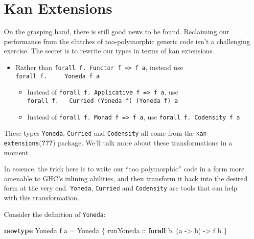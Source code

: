 \documentclass[
  11pt,
]{book}
\newenvironment{Shaded}{}{}
\newcommand{\DataTypeTok}[1]{\textcolor[rgb]{0.56,0.13,0.00}{#1}}
\newcommand{\KeywordTok}[1]{\textcolor[rgb]{0.00,0.44,0.13}{\textbf{#1}}}
\newcommand{\NormalTok}[1]{#1}
\newcommand{\OperatorTok}[1]{\textcolor[rgb]{0.40,0.40,0.40}{#1}}
\newcommand{\OtherTok}[1]{\textcolor[rgb]{0.00,0.44,0.13}{#1}}
\providecommand{\tightlist}{%
  \setlength{\itemsep}{0pt}\setlength{\parskip}{0pt}}
\theoremstyle{nonumberplain}
\begin{document}
\hypertarget{kan-extensions}{%
\section{Kan Extensions}\label{kan-extensions}}

On the grasping hand, there is still good news to be found. Reclaiming
our performance from the clutches of too-polymorphic generic code isn't
a challenging exercise. The secret is to rewrite our types in terms of
kan extensions.

\begin{itemize}
\tightlist
\item
  Rather than \texttt{forall\ f.\ Functor\ f\ =\textgreater{}\ f\ a},
  instead use \texttt{forall\ f.\ \ \ \ \ Yoneda\ f\ a}

  \begin{itemize}
  \tightlist
  \item
    Instead of
    \texttt{forall\ f.\ Applicative\ f\ =\textgreater{}\ f\ a}, use
    \texttt{forall\ f.\ \ \ Curried\ (Yoneda\ f)\ (Yoneda\ f)\ a}
  \item
    Instead of \texttt{forall\ f.\ Monad\ f\ =\textgreater{}\ f\ a}, use
    \texttt{forall\ f.\ Codensity\ f\ a}
  \end{itemize}
\end{itemize}

These types \texttt{Yoneda}, \texttt{Curried} and \texttt{Codensity} all
come from the \texttt{kan-extensions}({\textbf{???}}) package. We'll
talk more about these transformations in a moment.

In essence, the trick here is to write our ``too polymorphic'' code in a
form more amenable to GHC's inlining abilities, and then transform it
back into the desired form at the very end. \texttt{Yoneda},
\texttt{Curried} and \texttt{Codensity} are tools that can help with
this transformation.

Consider the definition of \texttt{Yoneda}:

\begin{Shaded}
\begin{Highlighting}[]
\KeywordTok{newtype} \DataTypeTok{Yoneda}\NormalTok{ f a }\OtherTok{=} \DataTypeTok{Yoneda}
\NormalTok{  \{}\OtherTok{ runYoneda ::} \KeywordTok{forall}\NormalTok{ b}\OperatorTok{.}\NormalTok{ (a }\OtherTok{{-}\textgreater{}}\NormalTok{ b) }\OtherTok{{-}\textgreater{}}\NormalTok{ f b}
\NormalTok{  \}}
\end{Highlighting}
\end{Shaded}
\end{document}
